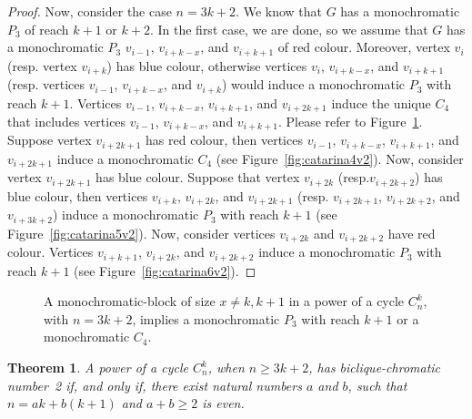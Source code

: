 \documentclass{article}
\newtheorem{theorem}{Theorem}
\begin{document}
\begin{proof}
Now, consider the case $n = 3k + 2$. We know that $G$ has a monochromatic $P_3$
of reach $k+1$ or $k+2$. In the first case, we are done, so we assume that $G$
has a monochromatic $P_3$ $v_{i-1}$, $v_{i+k-x}$, and $v_{i+k+1}$ of red colour.
Moreover, vertex $v_i$ (resp. vertex $v_{i+k}$) has blue colour, otherwise
vertices $v_i$, $v_{i+k-x}$, and $v_{i + k + 1}$ (resp. vertices $v_{i-1}$,
$v_{i+k-x}$, and $v_{i + k}$) would induce a monochromatic $P_3$ with reach
$k+1$. Vertices $v_{i-1}$, $v_{i+k-x}$, $v_{i+k+1}$, and $v_{i+2k+1}$ induce the
unique $C_4$ that includes vertices $v_{i-1}$, $v_{i+k-x}$, and $v_{i+k+1}$.
Please refer to Figure~\ref{fig:catarinav2.2}.
Suppose vertex $v_{i+2k+1}$ has red colour, then vertices $v_{i-1}$,
$v_{i+k-x}$, $v_{i+k+1}$, and $v_{i+2k+1}$ induce a monochromatic $C_4$ (see
Figure~\ref{fig:catarina4v2}).
Now, consider vertex $v_{i+2k+1}$ has blue colour. Suppose that vertex
$v_{i+2k}$ (resp.$v_{i+2k+2}$) has blue colour, then vertices $v_{i+k}$,
$v_{i+2k}$, and $v_{i+2k+1}$ (resp. $v_{i+2k+1}$, $v_{i+2k+2}$, and
$v_{i+3k+2}$) induce a monochromatic $P_3$ with reach $k+1$ (see
Figure~\ref{fig:catarina5v2}). Now, consider vertices $v_{i+2k}$ and
$v_{i+2k+2}$ have red colour. Vertices $v_{i+k+1}$, $v_{i+2k}$, and
$v_{i+2k+2}$ induce a monochromatic $P_3$ with reach $k+1$ (see
Figure~\ref{fig:catarina6v2}).
\end{proof}

\begin{figure}[t]
\centering
	\qquad
	\qquad
	\caption{A monochromatic-block of size $x \neq k, k+1$ in a power of a cycle
	$C_{n}^{k}$, with $n = 3k + 2$, implies a monochromatic $P_{3}$ with reach
	$k+1$ or a monochromatic $C_4$.}
	\label{fig:catarinav2.2}
\end{figure}


\begin{theorem}
\label{thm:kappabpowerofcyclethirdinterval}
A power of a cycle $C_n^k$, when $n \geq 3k + 2$, has biclique-chromatic
number~2 if, and only if, there exist natural numbers $a$ and $b$, such that $n =
ak + b(k+1)$ and $a + b \geq 2$ is even.
\end{theorem}
\end{document}
